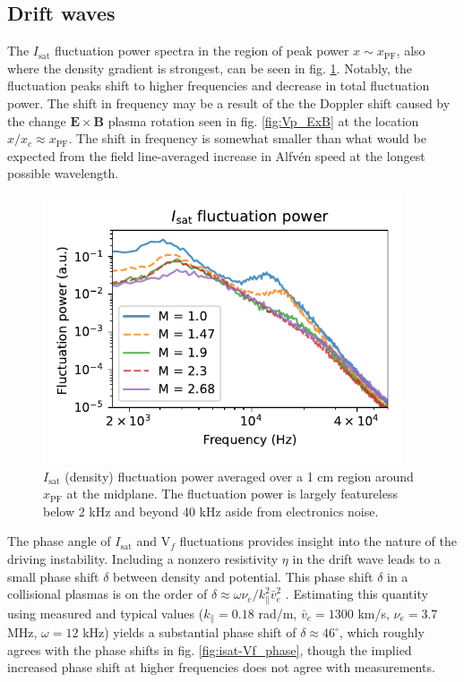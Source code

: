 \subsection{Drift waves}
The $I_\text{sat}$ fluctuation power spectra in the region of peak power $x \sim x_\text{PF}$, also where the density gradient is strongest, can be seen in fig. \ref{fig:isat_fluct_power}. Notably, the fluctuation peaks shift to higher frequencies and decrease in total fluctuation power. The shift in frequency may be a result of the the Doppler shift caused by the change $\boldsymbol{E \times B}$ plasma rotation seen in fig. \ref{fig:Vp_ExB} at the location $x/x_c \approx x_\text{PF}$. The shift in frequency is somewhat smaller than what would be expected from the field line-averaged increase in Alfv\'en speed at the longest possible wavelength.
\begin{figure}
    \centering
    \includegraphics[width=300pt]{figures/fig10.pdf}
    \caption[$I_\text{sat}$ (density) fluctuation power]{$I_\text{sat}$ (density) fluctuation power averaged over a 1 cm region around $x_\text{PF}$ at the midplane. The fluctuation power is largely featureless below 2 kHz and beyond 40 kHz aside from electronics noise.}
    \label{fig:isat_fluct_power}
\end{figure}
The phase angle of $I_\text{sat}$ and V$_f$ fluctuations provides insight into the nature of the driving instability. Including a nonzero resistivity $\eta$ in the drift wave leads to a small phase shift $\delta$ between density and potential.
This phase shift $\delta$ in a collisional plasmas is on the order of $\delta \approx \omega \nu_e / k_\parallel^2 \bar{v}_e^2$ \cite{Horton_1999}. Estimating this quantity using measured and typical values ($k_\parallel = 0.18$ rad/m, $\bar{v}_e = 1300$ km/s, $\nu_e = 3.7$ MHz, $\omega = 12$ kHz) yields a substantial phase shift of $\delta \approx 46^\circ$, which roughly agrees with the phase shifts in fig. \ref{fig:isat-Vf_phase}, though the implied increased phase shift at higher frequencies does not agree with measurements.

